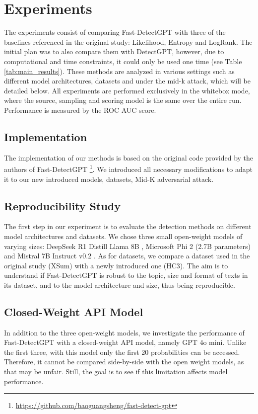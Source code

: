 \documentclass[11pt]{article}
\begin{document}
\section{Experiments}
The experiments consist of comparing Fast-DetectGPT with three of the baselines referenced in the original study: Likelihood, Entropy and LogRank. The initial plan was to also compare them with DetectGPT, however, due to computational and time constraints, it could only be used one time (see Table \ref{tab:main_results}). These methods are analyzed in various settings such as different model architectures, datasets and under the mid-k attack, which will be detailed below. All experiments are performed exclusively in the whitebox mode, where the source, sampling and scoring model is the same over the entire run. Performance is measured by the ROC AUC score.

\subsection{Implementation}

The implementation of our methods is based on the original code provided by the authors of Fast-DetectGPT \footnote{\url{https://github.com/baoguangsheng/fast-detect-gpt}}. We introduced all necessary modifications to adapt it to our new introduced models, datasets, Mid-K adversarial attack.


\subsection{Reproducibility Study}
The first step in our experiment is to evaluate the detection methods on different model architectures and datasets. We chose three small open-weight models of varying sizes: DeepSeek R1 Distill Llama 8B \cite{deepseekai}, Microsoft Phi 2 (2.7B parameters) \cite{phi2} and Mistral 7B Instruct v0.2 \cite{mistral}. As for datasets, we compare a dataset used in the original study (XSum) with a newly introduced one (HC3). The aim is to understand if Fast-DetectGPT is robust to the topic, size and format of texts in its dataset, and to the model architecture and size, thus being reproducible.


\subsection{Closed-Weight API Model}
In addition to the three open-weight models, we investigate the performance of Fast-DetectGPT with a closed-weight API model, namely GPT 4o mini. Unlike the first three, with this model only the first 20 probabilities can be accessed. Therefore, it cannot be compared side-by-side with the open weight models, as that may be unfair. Still, the goal is to see if this limitation affects model performance.
\end{document}
